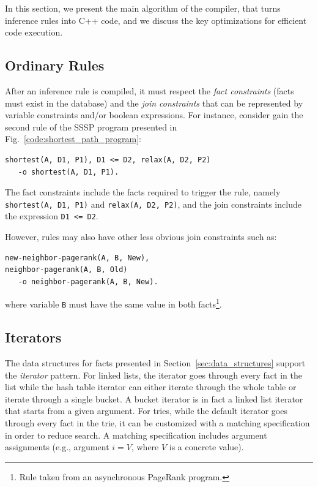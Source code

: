 In this section, we present the main algorithm of the compiler, that turns
inference rules into C++ code, and we discuss the key optimizations for
efficient code execution.

\subsection{Ordinary Rules}\label{sec:compile}

After an inference rule is compiled, it must respect the \emph{fact constraints}
(facts must exist in the database) and the \emph{join constraints} that can be
represented by variable constraints and/or boolean expressions. For instance,
consider gain the second rule of the SSSP program presented in
Fig.~\ref{code:shortest_path_program}:

\begin{Verbatim}[label=example_rule]
shortest(A, D1, P1), D1 <= D2, relax(A, D2, P2)
   -o shortest(A, D1, P1).
\end{Verbatim}

The fact constraints include the facts required to trigger the rule, namely
\texttt{shortest(A, D1, P1)} and \texttt{relax(A, D2, P2)}, and the join
constraints include the expression \texttt{D1 <= D2}.

However, rules may also have other less obvious join constraints such as:

\begin{Verbatim}
new-neighbor-pagerank(A, B, New),
neighbor-pagerank(A, B, Old)
   -o neighbor-pagerank(A, B, New).
\end{Verbatim}

\noindent
where variable \texttt{B} must have the same value in both facts\footnote{Rule taken
from an asynchronous PageRank program.}.

\subsection{Iterators}

The data structures for facts presented in Section~\ref{sec:data_structures}
support the \emph{iterator} pattern. For linked lists, the iterator goes
through every fact in the list while the hash table iterator can either iterate
through the whole table or iterate through a single bucket. A bucket iterator is
in fact a linked list iterator that starts from a given argument.
For tries, while the default iterator goes through every fact in
the trie, it can be customized with a matching specification in
order to reduce search. A matching specification includes argument
assignments (e.g., argument $i = V$, where $V$ is a concrete value).

